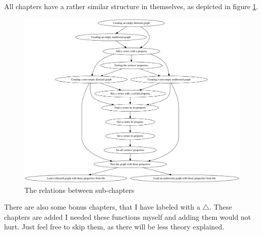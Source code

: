 All chapters have a rather similar structure in themselves, as depicted
in figure \ref{fig:The-relations-between-subchapters}.

\begin{figure}[!htbp]
  \includegraphics[width=\textwidth]{create_tutorial_subchapters_graph.png}
  \caption{
    The relations between sub-chapters
  }
  \label{fig:The-relations-between-subchapters}
\end{figure}

There are also some bonus chapters, that I have labeled with a $\triangle$.
These chapters are added I needed these functions myself and adding them
would not hurt.
Just feel free to skip them, as there will be less theory explained.

